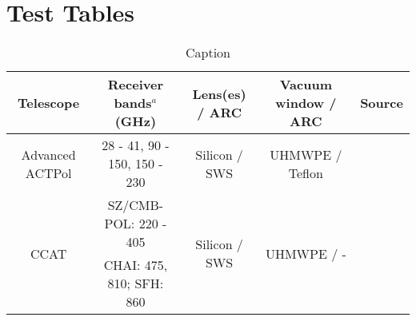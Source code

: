 
\section{Test Tables}
\label{sec:tables}

\begin{table}[h]
\begin{adjustbox}{width=1\textwidth,center}
\begin{tabular}{|c|c|c|c|c|}
\hline
\bf{Telescope} & \bf{ Receiver bands$^{a}$ (GHz)} & \bf{Lens(es) / ARC} & \bf{Vacuum window / ARC}  & \bf{Source}\\ \hline
 Advanced ACTPol & 28 - 41, 90 - 150, 150 - 230 & Silicon / SWS & UHMWPE / Teflon & \cite{ep3}\\ \hline
   \multirow{2}{*}{ CCAT} & SZ/CMB-POL: 220 - 405   &  \multirow{2}{*}{Silicon / SWS} &   \multirow{2}{*}{UHMWPE / -} &  \multirow{2}{*}{\cite{}}\\ 
                                   & CHAI: 475, 810; SFH: 860  &  & & \\ \hline
\end{tabular}
\end{adjustbox}
\vspace{-0.13in}
\caption{ \small \setlength{\baselineskip}{0.95\baselineskip}
Caption
\label{tab:msmreceivers} }
\vspace{-0.05in}
\end{table}




 

